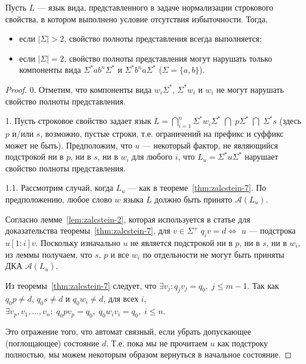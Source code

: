 \documentclass[fontsize=14pt]{scrartcl}
\begin{document}
\begin{Proposition}
\label{prop:fullness-of-representation}
Пусть $L$ --- язык вида, представленного в задаче нормализации строкового свойства, в котором выполнено условие отсутствия избыточности.
Тогда,
\begin{itemize}
\item если $|\Sigma| > 2$, свойство полноты представления всегда выполняется;
\item если $|\Sigma| = 2$, свойство полноты представления могут нарушать только компоненты вида $\Sigma^* ab^n \Sigma^*$ и $\Sigma^* b^n a \Sigma^*$
($\Sigma = \{a, b\}$).
\end{itemize}
\end{Proposition}

\begin{proof}

0. Отметим, что компоненты вида $w_i \Sigma^*$, $\Sigma^* w_i$ и $w_i$ не могут нарушать свойство полноты представления.

1. Пусть строковое свойство задает язык $L = \bigcap_{i=1}^n \Sigma^* w_i \Sigma^* \;  \bigcap \; p \Sigma^* \; \bigcap \; \Sigma^* s$
(здесь $p$ и/или $s$, возможно, пустые строки, т.е. ограничений на префикс и суффикс может не быть). 
Предположим, что $u$ --- некоторый фактор, не являющийся подстрокой ни в $p$, ни в $s$, ни в $w_i$ для любого $i$, что
$L_u = \Sigma^* u \Sigma^*$ нарушает свойство полноты представления.

1.1. Рассмотрим случай, когда $L_u$ --- как в теореме~\ref{thm:zalcstein-7}. 
По предположению, любое слово $w$ языка $L$ должно быть принято $\mathcal{A}(L_u)$.

Согласно лемме~\ref{lem:zalcstein-2}, которая используется в статье для доказательства теоремы~\ref{thm:zalcstein-7}, для 
$ v \in \Sigma^+  \; q_i v = d \iff $
 $u$ --- подстрока $u[1:i]v$. Поскольку изначально $u$ не является подстрокой ни в $p$, ни в $s$, ни в $w_i$,
 из леммы получаем, что $s$, $p$ и все $w_i$ по отдельности не могут быть приняты ДКА $\mathcal{A}(L_u)$.

  Из теоремы~\ref{thm:zalcstein-7} 
 следует, что $\exists v_j : q_j v_j = q_0, \; j \leq m-1$. Так как $q_0 p \neq d$,\; $q_0 s \neq d$ и $q_0 w_i \neq d$, для всех $i$,
 $\exists v_p, v_1, \ldots, v_n :\; q_0 p v_p = q_0,\; q_0 w_i v_i = q_0, \; i \leq n$.

 Это отражение того, что автомат связный, если убрать допускающее (поглощающее) состояние $d$. Т.е. 
 пока мы не прочитаем $u$ как подстроку полностью, мы можем некоторым образом вернуться в начальное состояние.


\end{proof}
\end{document}
